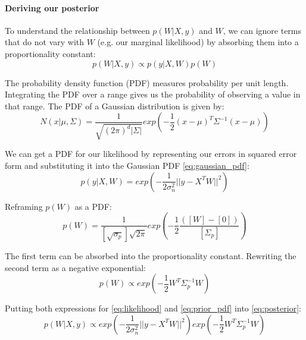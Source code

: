 \paragraph{Deriving our posterior}
To understand the relationship between $p(W|X,y)$ and $W$, we can ignore terms that do not vary with $W$ (e.g. our marginal likelihood) by absorbing them into a proportionality constant:
\begin{equation} \label{eq:posterior}
    p(W|X, y) \propto p(y|X,W)p(W)
\end{equation}


The probability density function (PDF) measures probability per unit length. Integrating the PDF over a range gives us the probability of observing a value in that range. The PDF of a Gaussian distribution is given by:
\begin{equation} \label{eq:gaussian_pdf}
    N(x | \mu, \Sigma) = \frac{1}{\sqrt{(2\pi)^d |\Sigma|}} exp\left(-\frac{1}{2}(x - \mu)^T\Sigma^{-1}(x- \mu)\right)
\end{equation}

We can get a PDF for our likelihood by representing our errors in squared error form and substituting it into the Gaussian PDF \ref{eq:gaussian_pdf}:
\begin{equation} \label{eq:likelihood}
    p(y|X,W) = exp\left(-\frac{1}{2\sigma^2_n}||y -X^TW||^2\right)
\end{equation}

Reframing $p(W)$ as a PDF:
 \begin{equation*}
     p(W) = \frac{1}{[\sqrt{\sigma_p}]\sqrt{2\pi}} exp\left(-\frac{1}{2}\frac{([W]-[0])}{[\Sigma_p]}\right)
\end{equation*}

The first term can be absorbed into the proportionality constant. Rewriting the second term as a negative exponential:
\begin{equation} \label{eq:prior_pdf}
    p(W) \propto exp\left(-\frac{1}{2}W^T\Sigma_p^{-1}W\right)
\end{equation}

Putting both expressions for \ref{eq:likelihood} and \ref{eq:prior_pdf} into \ref{eq:posterior}:
\begin{equation*}
    p(W|X,y) \propto exp\left(-\frac{1}{2\sigma^2_n}||y -X^TW||^2\right)exp\left(-\frac{1}{2}W^T\Sigma_p^{-1}W\right)
\end{equation*}

